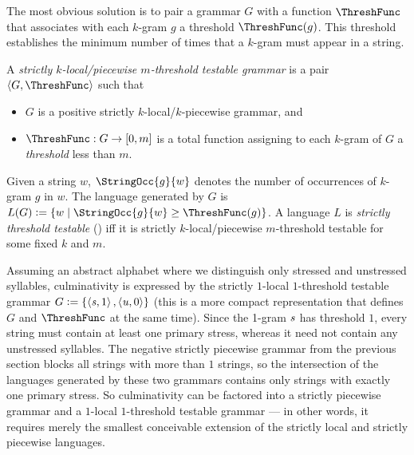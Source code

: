The most obvious solution is to pair a grammar $G$ with a function $\ThreshFunc$ that associates with each $k$-gram $g$ a threshold $\ThreshFunc(g)$.
This threshold establishes the minimum number of times that a $k$-gram must appear in a string.
%
\begin{definition}
    A \emph{strictly $k$-local\slash piecewise $m$-threshold testable grammar} is a pair $\tuple{G,\ThreshFunc}$ such that
    \begin{itemize}
        \item $G$ is a positive strictly $k$-local\slash $k$-piecewise grammar, and
        \item $\ThreshFunc: G \rightarrow [0,m]$ is a total function assigning to each $k$-gram of $G$ a \emph{threshold} less than $m$.
    \end{itemize}
    Given a string $w$, $\StringOcc{g}{w}$ denotes the number of occurrences of $k$-gram $g$ in $w$.
    The language generated by $G$ is $L(G) \is \setof{ w \mid \StringOcc{g}{w} \geq \ThreshFunc(g) }$.
    A language $L$ is \emph{strictly threshold testable} (\STT) iff it is strictly $k$-local\slash piecewise $m$-threshold testable for some fixed $k$ and $m$.
\end{definition}
%
Assuming an abstract alphabet where we distinguish only stressed and unstressed syllables, culminativity is expressed by the strictly $1$-local $1$-threshold testable grammar $G \mathrel{\mathop:}= \left \{ \left \langle \mathit{s},1 \right \rangle ,\left \langle \mathit{u},0 \right \rangle  \right \}$ (this is a more compact representation that defines $G$ and $\ThreshFunc$ at the same time).
Since the 1-gram $\mathit{s}$ has threshold $1$, every string must contain at least one primary stress, whereas it need not contain any unstressed syllables.
The negative strictly piecewise grammar from the previous section blocks all strings with more than $1$ strings, so the intersection of the languages generated by these two grammars contains only strings with exactly one primary stress.
So culminativity can be factored into a strictly piecewise grammar and a $1$-local $1$-threshold testable grammar --- in other words, it requires merely the smallest conceivable extension of the strictly local and strictly piecewise languages.

